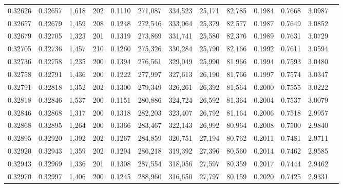 \begin{tabular}{rrrrrrrrrrrrr}
0.32626 & 0.32657 & 1,618 & 202 &                                     0.1110 & 271,087 & 334,523 &  25,171 &  82,785 & 0.1984 & 0.7668 & 3.0987 \\
0.32657 & 0.32679 & 1,459 & 208 &                                     0.1248 & 272,546 & 333,064 &  25,379 &  82,577 & 0.1987 & 0.7649 & 3.0852 \\
0.32679 & 0.32705 & 1,323 & 201 &                                     0.1319 & 273,869 & 331,741 &  25,580 &  82,376 & 0.1989 & 0.7631 & 3.0729 \\
0.32705 & 0.32736 & 1,457 & 210 &                                     0.1260 & 275,326 & 330,284 &  25,790 &  82,166 & 0.1992 & 0.7611 & 3.0594 \\
0.32736 & 0.32758 & 1,235 & 200 &                                     0.1394 & 276,561 & 329,049 &  25,990 &  81,966 & 0.1994 & 0.7593 & 3.0480 \\
0.32758 & 0.32791 & 1,436 & 200 &                                     0.1222 & 277,997 & 327,613 &  26,190 &  81,766 & 0.1997 & 0.7574 & 3.0347 \\
0.32791 & 0.32818 & 1,352 & 202 &                                     0.1300 & 279,349 & 326,261 &  26,392 &  81,564 & 0.2000 & 0.7555 & 3.0222 \\
0.32818 & 0.32846 & 1,537 & 200 &                                     0.1151 & 280,886 & 324,724 &  26,592 &  81,364 & 0.2004 & 0.7537 & 3.0079 \\
0.32846 & 0.32868 & 1,317 & 200 &                                     0.1318 & 282,203 & 323,407 &  26,792 &  81,164 & 0.2006 & 0.7518 & 2.9957 \\
0.32868 & 0.32895 & 1,264 & 200 &                                     0.1366 & 283,467 & 322,143 &  26,992 &  80,964 & 0.2008 & 0.7500 & 2.9840 \\
0.32895 & 0.32920 & 1,392 & 202 &                                     0.1267 & 284,859 & 320,751 &  27,194 &  80,762 & 0.2011 & 0.7481 & 2.9711 \\
0.32920 & 0.32943 & 1,359 & 202 &                                     0.1294 & 286,218 & 319,392 &  27,396 &  80,560 & 0.2014 & 0.7462 & 2.9585 \\
0.32943 & 0.32969 & 1,336 & 201 &                                     0.1308 & 287,554 & 318,056 &  27,597 &  80,359 & 0.2017 & 0.7444 & 2.9462 \\
0.32970 & 0.32997 & 1,406 & 200 &                                     0.1245 & 288,960 & 316,650 &  27,797 &  80,159 & 0.2020 & 0.7425 & 2.9331 \\

\end{tabular}
